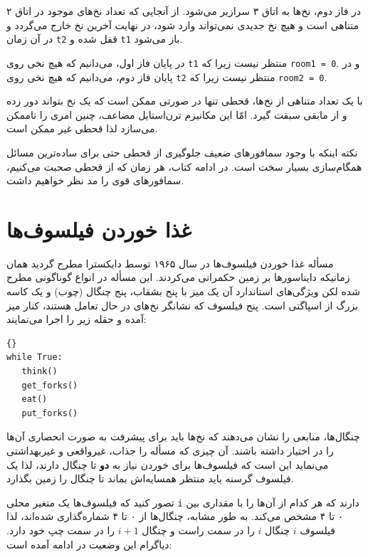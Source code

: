 \documentclass{book}
\newcommand{\clearemptydoublepage}{}%
\begin{document}
    در فاز دوم، نخ‌ها به اتاق ۳ سرازیر می‌شود. از آنجایی که تعداد نخ‌های موجود در اتاق ۲ متناهی است و هیچ نخ جدیدی نمی‌تواند وارد شود، 
    در نهایت آخرین نخ خارج می‌گردد و در آن زمان  {\tt t2} قفل شده و  {\tt t1} باز می‌شود. 

    در پایان فاز اول، می‌دانیم که هیچ نخی روی  {\tt t1} منتظر نیست زیرا که {\tt room1 = 0}.
    و در پایان فاز دوم، می‌دانیم که هیچ نخی روی {\tt t2} منتظر نیست زیرا که {\tt room2 = 0}. 

    با یک تعداد متناهی از نخ‌ها، قحطی تنها در صورتی ممکن است که یک نخ بتواند دور زده و از مابقی سبقت گیرد.
    امّا این مکانیزم ترن‌استایل مضاعف، چنین امری را ناممکن می‌سازد لذا قحطی غیر ممکن است. 

    نکته اینکه با وجود سمافورهای ضعیف جلوگیری از قحطی حتی برای ساده‌ترین مسائل همگام‌سازی بسیار سخت است.
    در ادامه کتاب، هر زمان که از قحطی صحبت می‌کنیم، سمافورهای قوی را مد نظر خواهیم داشت. 


\clearemptydoublepage
\section{غذا خوردن فیلسوف‌ها}
\label{dining}

    مسأله غذا خوردن فیلسوف‌ها در سال ۱۹۶۵ توسط دایکسترا مطرح گردید همان زمانیکه دایناسورها بر زمین حکمرانی می‌کردند\cite{dijkstra65}. 
    این مسأله در انواع گوناگونی مطرح شده لکن ویژگی‌های استاندارد آن یک میز با پنج بشقاب، پنج چنگال (چوب) و یک کاسه بزرگ از اسپاگتی است. 
    پنج فیلسوف که نشانگر نخ‌های در حال تعامل هستند، کنار میز آمده و حقله زیر را اجرا می‌نمایند: 
    
\begin{latin}
\begin{lstlisting}[title=\rl{حلقهٔ اصلی فیلسوف}]{}
while True:
   think()
   get_forks()
   eat()
   put_forks()
\end{lstlisting}
\end{latin}

    چنگال‌ها، منابعی را نشان می‌دهند که نخ‌ها باید برای پیشرفت به صورت انحصاری آن‌ها را در اختیار داشته باشند.
    آن چیزی که مسأله را جذاب، غیرواقعی و غیربهداشتی می‌نماید این است که فیلسوف‌ها برای  خوردن نیاز به \textbf{دو} تا چنگال دارند، لذا 
    یک فیلسوف گرسنه باید منتظر همسایه‌اش بماند تا چنگال را زمین بگذارد. 

    تصور کنید که فیلسوف‌ها یک متغیر محلی {\tt i} دارند که هر کدام  از آن‌ها را با مقداری بین ۰ تا ۴ مشخص می‌کند. 
    به طور مشابه، چنگال‌ها از ۰ تا ۴ شماره‌گذاری شده‌اند، 
    لذا فیلسوف $i$ چنگال $i$ را در سمت راست و چنگال  $i+1$  را در سمت چپ خود دارد.
    دیاگرام این وضعیت در ادامه آمده است: 
\end{document}
